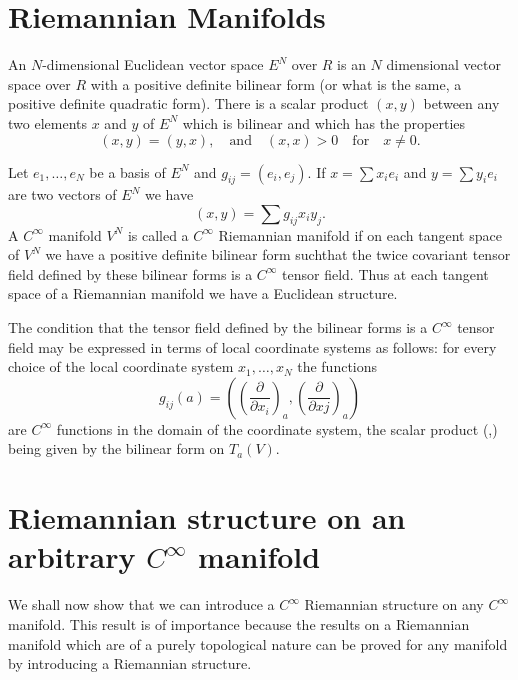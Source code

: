 \section*{Riemannian Manifolds}

An $N$-dimensional Euclidean vector space $E^{N}$ over $R$ is an $N$
dimensional vector space over $R$ with a positive definite bilinear
form (or what is the same, a positive definite quadratic form). There
is a scalar product $(x,y)$ between any two elements $x$ and $y$ of
$E^{N}$ which is bilinear and which has the properties 
$$
(x,y)=(y,x),\quad\text{and}\quad (x,x)>0\quad\text{for}\quad x\neq 0.
$$

Let $e_{1},\ldots,e_{N}$ be a basis of $E^{N}$ and
$g_{ij}=(e_{i},e_{j})$. If $x=\sum x_{i}e_{i}$ and $y=\sum y_{i}e_{i}$
are two vectors of $E^{N}$ we have
$$
(x,y)=\sum g_{ij}x_{i}y_{j}.
$$
A $C^{\infty}$ manifold $V^{N}$ is called a $C^{\infty}$ Riemannian
manifold if on each tangent space of $V^{N}$ we have a positive
definite bilinear form such\pageoriginale that the twice covariant
tensor field defined by these bilinear forms is a $C^{\infty}$ tensor
field. Thus at each tangent space of a Riemannian manifold we have a
Euclidean structure.

The condition that the tensor field defined by the bilinear forms is a
$C^{\infty}$ tensor field may be expressed in terms of local
coordinate systems as follows: for every choice of the local
coordinate system $x_{1},\ldots,x_{N}$ the functions
$$
g_{ij}(a)=\left(\left(\frac{\partial}{\partial
  x_{i}}\right)_{a},\left(\frac{\partial}{\partial
  xj}\right)_{a}\right)
$$
are $C^{\infty}$ functions in the domain of the coordinate system, the
scalar product (\;,\;) being given by the bilinear form on $T_{a}(V)$.

\section*{Riemannian structure on an arbitrary $C^{\infty}$ manifold}

We shall now show that we can introduce a $C^{\infty}$ Riemannian
structure on any $C^{\infty}$ manifold. This result is of importance
because the results on a Riemannian manifold which are of a purely
topological nature can be proved for any manifold by introducing a
Riemannian structure.

